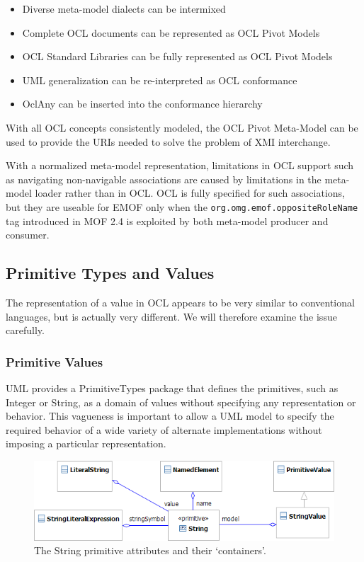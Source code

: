 \documentclass{eceasst}
\begin{document}
\begin{itemize}
\item Diverse meta-model dialects can be intermixed
\item Complete OCL documents can be represented as OCL Pivot Models
\item OCL Standard Libraries can be fully represented as OCL Pivot Models
\item UML generalization can be re-interpreted as OCL conformance
\item OclAny can be inserted into the conformance hierarchy
\end{itemize}

With all OCL concepts consistently modeled, the OCL Pivot Meta-Model can be used to provide the URIs needed to solve the problem of XMI interchange.

With a normalized meta-model representation, limitations in OCL support such as navigating non-navigable associations are caused by limitations in the meta-model loader rather than in OCL. OCL is fully specified for such associations, but they are useable for EMOF only when the \verb|org.omg.emof.oppositeRoleName| tag introduced in MOF 2.4\cite{MOF-2.4} is exploited by both meta-model producer and consumer.

\subsection{Primitive Types and Values}\label{Values}

The representation of a value in OCL appears to be very similar to conventional languages, but is actually very different. We will therefore examine the issue carefully.

\subsubsection{Primitive Values}

UML provides a PrimitiveTypes package that defines the primitives, such as Integer or String, as a domain of values without specifying any representation or behavior. This vagueness is important to allow a UML model to specify the required behavior of a wide variety of alternate implementations without imposing a particular representation.

\begin{figure}
  \begin{center}
    \includegraphics[width=5.0in]{String.png}
  \end{center}
  \caption{The String primitive attributes and their `containers'.}
  \label{fig:String}
\end{figure}
\end{document}
